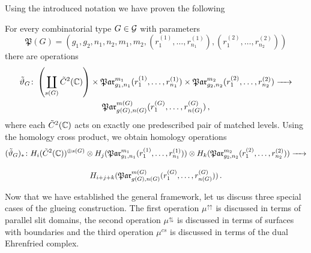 Using the introduced notation we have proven the following
\begin{prop}
    \label{homology_operations:parallel_patching_slit_pics:glueing_construction_defines_operations}
    For every combinatorial type $G \in \mathcal{G}$ with parameters
    \[
        \mathfrak P(G) = (g_1, g_2, n_1, n_2, m_1, m_2, (r_1^{(1)}, \ldots, r_{n_1}^{(1)}), (r_1^{(2)}, \ldots, r_{n_2}^{(2)}))
    \]
    there are operations
    \begin{multline*}
        \tilde\vartheta_G \colon 
            \left( \coprod_{s(G)} \cspc 2(\C) \right) \times
            \Par_{g_1, n_1}^{m_1}(r_1^{(1)}, \ldots, r_{n_1}^{(1)}) \times
            \Par_{g_2, n_2}^{m_2}(r_1^{(2)}, \ldots, r_{n_2}^{(2)}) \to\\
            \Par_{g(G), n(G)}^{m(G)}(r^{(G)}_1, \ldots, r^{(G)}_{n(G)}) \,,
    \end{multline*}
    where each ${\tilde C^{2}}(\mathbb C)$ acts on exactly one predescribed pair of matched levels.
    Using the homology cross product, we obtain homology operations
    \begin{multline*}
        (\tilde\vartheta_G)_\ast \colon 
            H_i(\cspc 2(\C))^{\oplus s(G)} \otimes
            H_j(\Par_{g_1, n_1}^{m_1}(r_1^{(1)}, \ldots, r_{n_1}^{(1)})) \otimes
            H_k(\Par_{g_2, n_2}^{m_2}(r_1^{(2)}, \ldots, r_{n_2}^{(2)})) \to\\[10pt]
            H_{i+j+k}(\Par_{g(G), n(G)}^{m(G)}(r^{(G)}_1, \ldots, r^{(G)}_{n(G)})) \,.
    \end{multline*}
\end{prop}

Now that we have established the general framework, let us discuss three special cases of the glueing construction.
The first operation $\mu^{\upuparrows}$ is discussed in terms of parallel slit domains,
the second operation $\mu^{\updownarrows}$ is discussed in terms of surfaces with boundaries
and the third operation $\mu^{cs}$ is discussed in terms of the dual Ehrenfried complex.

